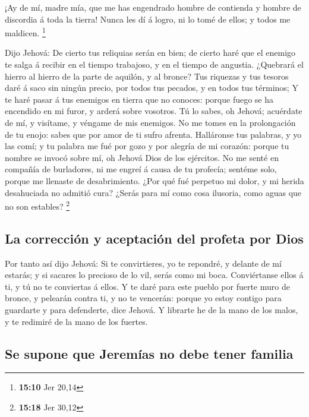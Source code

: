  ¡Ay de mí, madre mía, que me has engendrado hombre de
contienda y hombre de discordia á toda la tierra! Nunca les dí á logro,
ni lo tomé de ellos; y todos me maldicen. \footnote{\textbf{15:10} Jer
  20,14}

 Dijo Jehová: De cierto tus reliquias serán en bien; de
cierto haré que el enemigo te salga á recibir en el tiempo trabajoso, y
en el tiempo de angustia.  ¿Quebrará el hierro al hierro
de la parte de aquilón, y al bronce?  Tus riquezas y tus
tesoros daré á saco sin ningún precio, por todos tus pecados, y en todos
tus términos;  Y te haré pasar á tus enemigos en tierra
que no conoces: porque fuego se ha encendido en mi furor, y arderá sobre
vosotros.  Tú lo sabes, oh Jehová; acuérdate de mí, y
visítame, y véngame de mis enemigos. No me tomes en la prolongación de
tu enojo: sabes que por amor de ti sufro afrenta. 
Halláronse tus palabras, y yo las comí; y tu palabra me fué por gozo y
por alegría de mi corazón: porque tu nombre se invocó sobre mí, oh
Jehová Dios de los ejércitos.  No me senté en compañía de
burladores, ni me engreí á causa de tu profecía; sentéme solo, porque me
llenaste de desabrimiento.  ¿Por qué fué perpetuo mi
dolor, y mi herida desahuciada no admitió cura? ¿Serás para mí como cosa
ilusoria, como aguas que no son estables? \footnote{\textbf{15:18} Jer
  30,12}

\hypertarget{la-correcciuxf3n-y-aceptaciuxf3n-del-profeta-por-dios}{%
\subsection{La corrección y aceptación del profeta por
Dios}\label{la-correcciuxf3n-y-aceptaciuxf3n-del-profeta-por-dios}}

 Por tanto así dijo Jehová: Si te convirtieres, yo te
repondré, y delante de mí estarás; y si sacares lo precioso de lo vil,
serás como mi boca. Conviértanse ellos á ti, y tú no te conviertas á
ellos.  Y te daré para este pueblo por fuerte muro de
bronce, y pelearán contra ti, y no te vencerán: porque yo estoy contigo
para guardarte y para defenderte, dice Jehová.  Y
librarte he de la mano de los malos, y te redimiré de la mano de los
fuertes.

\hypertarget{se-supone-que-jeremuxedas-no-debe-tener-familia}{%
\subsection{Se supone que Jeremías no debe tener
familia}\label{se-supone-que-jeremuxedas-no-debe-tener-familia}}

